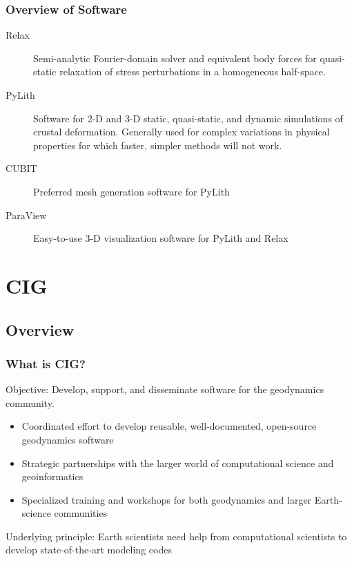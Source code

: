 \documentclass{beamer}
\begin{document}
\begin{frame}
  \frametitle{Overview of Software}
  \summary{}
  
  \vfill
  \begin{description}
  \item[Relax] Semi-analytic Fourier-domain solver and equivalent body
    forces for quasi-static relaxation of stress perturbations in a
    homogeneous half-space.
  \item[PyLith] Software for 2-D and 3-D static, quasi-static, and
    dynamic simulations of crustal deformation. Generally used for
    complex variations in physical properties for which faster, simpler
    methods will not work.
  \item[CUBIT] Preferred mesh generation software for PyLith
  \item[ParaView] Easy-to-use 3-D visualization software for PyLith and Relax
  \end{description}  

\end{frame}


\section{CIG}
\subsection{Overview}

\begin{frame}
  \frametitle{What is CIG?}
 
  \vfill

  Objective: Develop, support, and disseminate software for the
  geodynamics community.

  \vfill

  \begin{itemize}
  \item Coordinated effort to develop reusable, well-documented,
    open-source geodynamics software
  \item Strategic partnerships with the larger world of
    computational science and geoinformatics
  \item Specialized training and workshops for both geodynamics and
    larger Earth-science communities
  \end{itemize}

  \vfill
 
  Underlying principle: Earth scientists need help from computational
  scientists to develop state-of-the-art modeling codes

\end{frame}
\end{document}
